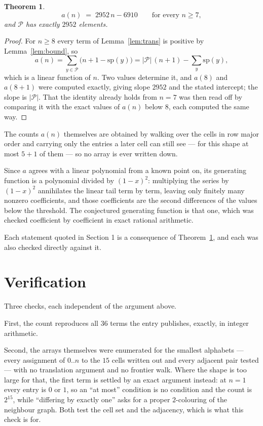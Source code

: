 \documentclass[11pt,a4paper]{article}
\theoremstyle{plain}
\newtheorem{theorem}{Theorem}
\theoremstyle{definition}
\begin{document}
\begin{theorem}\label{thm:line}
\[
a(n)\;=\;2952\,n-6910\qquad\text{for every }n\ge7,
\]
and $\mathcal P$ has exactly $2952$ elements.
\end{theorem}

\begin{proof}
For $n\ge8$ every term of Lemma~\ref{lem:trans} is positive by
Lemma~\ref{lem:bound}, so
\[
a(n)=\sum_{y\in\mathcal P}\bigl(n+1-\mathrm{sp}(y)\bigr)
=|\mathcal P|\,(n+1)-\sum_{y}\mathrm{sp}(y),
\]
which is a linear function of $n$. Two values determine it, and $a(8)$ and
$a(8+1)$ were computed exactly, giving slope $2952$ and the stated intercept; the slope
is $|\mathcal P|$. That the identity already holds from $n=7$ was then read off by
comparing it with the exact values of $a(n)$ below $8$, each computed the same way.
\end{proof}

The counts $a(n)$ themselves are obtained by walking over the cells in row major order and
carrying only the entries a later cell can still see --- for this shape at most $5+1$ of
them --- so no array is ever written down.

Since $a$ agrees with a linear polynomial from a known point on, its generating function is a
polynomial divided by $(1-x)^2$: multiplying the series by $(1-x)^2$ annihilates the linear
tail term by term, leaving only finitely many nonzero coefficients, and those coefficients are
the second differences of the values below the threshold. The conjectured generating function
is that one, which was checked coefficient by coefficient in exact rational arithmetic.

Each statement quoted in Section 1 is a consequence of Theorem~\ref{thm:line}, and each was
also checked directly against it.

\section{Verification}

Three checks, each independent of the argument above.

First, the count reproduces all $36$ terms the entry publishes, exactly, in integer
arithmetic.

Second, the arrays themselves were enumerated for the smallest alphabets --- every assignment
of $0..n$ to the $15$ cells written out and every adjacent pair tested --- with no
translation argument and no frontier walk. Where the shape is too large for that, the first
term is settled by an exact argument instead: at $n=1$ every entry is $0$ or $1$, so an ``at
most'' condition is no condition and the count is $2^{15}$, while ``differing by exactly
one'' asks for a proper $2$-colouring of the neighbour graph. Both test the cell set and the
adjacency, which is what this check is for.
\end{document}
